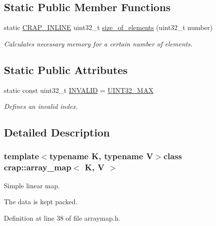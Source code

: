 \subsection*{Static Public Member Functions}
\begin{DoxyCompactItemize}
\item 
static \hyperlink{config__x86_8h_a5a40526b8d842e7ff731509998bb0f1c}{C\+R\+A\+P\+\_\+\+I\+N\+L\+I\+N\+E} uint32\+\_\+t \hyperlink{classcrap_1_1array__map_acbe6ebf74c40f5a5bb24299bd22b28d6}{size\+\_\+of\+\_\+elements} (uint32\+\_\+t number)
\begin{DoxyCompactList}\small\item\em Calculates necessary memory for a certain number of elements. \end{DoxyCompactList}\end{DoxyCompactItemize}
\subsection*{Static Public Attributes}
\begin{DoxyCompactItemize}
\item 
static const uint32\+\_\+t \hyperlink{classcrap_1_1array__map_af3441f93d975dab3aead6ba30e8ddf67}{I\+N\+V\+A\+L\+I\+D} = \hyperlink{crap__types_8h_ab5eb23180f7cc12b7d6c04a8ec067fdd}{U\+I\+N\+T32\+\_\+\+M\+A\+X}
\begin{DoxyCompactList}\small\item\em Defines an invalid index. \end{DoxyCompactList}\end{DoxyCompactItemize}


\subsection{Detailed Description}
\subsubsection*{template$<$typename K, typename V$>$class crap\+::array\+\_\+map$<$ K, V $>$}

Simple linear map. 

The data is kept packed. 

Definition at line 38 of file arraymap.\+h.



